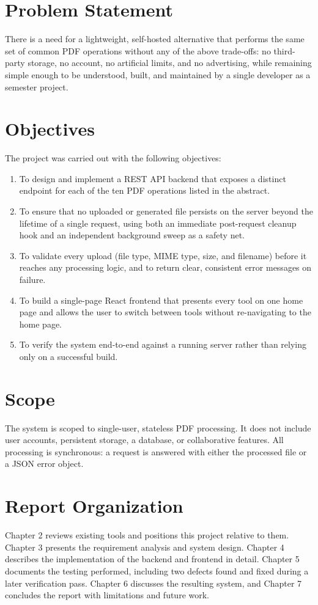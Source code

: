 \documentclass[12pt,a4paper]{report}
\begin{document}
\section{Problem Statement}
There is a need for a lightweight, self-hosted alternative that performs the same set of common
PDF operations without any of the above trade-offs: no third-party storage, no account, no
artificial limits, and no advertising, while remaining simple enough to be understood, built, and
maintained by a single developer as a semester project.

\section{Objectives}
The project was carried out with the following objectives:
\begin{enumerate}[label=\arabic*.]
  \item To design and implement a REST API backend that exposes a distinct endpoint for each of
        the ten PDF operations listed in the abstract.
  \item To ensure that no uploaded or generated file persists on the server beyond the lifetime
        of a single request, using both an immediate post-request cleanup hook and an
        independent background sweep as a safety net.
  \item To validate every upload (file type, MIME type, size, and filename) before it reaches any
        processing logic, and to return clear, consistent error messages on failure.
  \item To build a single-page React frontend that presents every tool on one home page and
        allows the user to switch between tools without re-navigating to the home page.
  \item To verify the system end-to-end against a running server rather than relying only on a
        successful build.
\end{enumerate}

\section{Scope}
The system is scoped to single-user, stateless PDF processing. It does not include user accounts,
persistent storage, a database, or collaborative features. All processing is synchronous:
a request is answered with either the processed file or a JSON error object.

\section{Report Organization}
Chapter 2 reviews existing tools and positions this project relative to them. Chapter 3 presents
the requirement analysis and system design. Chapter 4 describes the implementation of the
backend and frontend in detail. Chapter 5 documents the testing performed, including two defects
found and fixed during a later verification pass. Chapter 6 discusses the resulting system, and
Chapter 7 concludes the report with limitations and future work.
\end{document}
